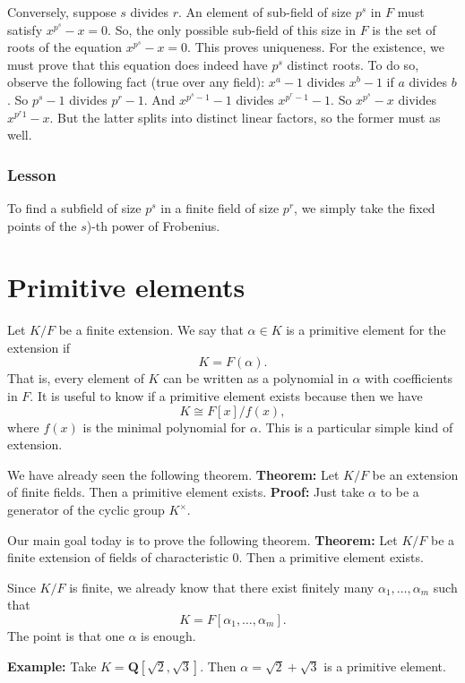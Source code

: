\documentclass[11pt]{article}
\begin{document}
Conversely, suppose \(s\) divides \(r\).
An element of sub-field of size \(p^s\) in \(F\) must satisfy \(x^{p^s}-x = 0\).
So, the only possible sub-field of this size in \(F\) is the set of roots of the equation \(x^{p^s}-x = 0\).
This proves uniqueness.
For the existence, we must prove that this equation does indeed have \(p^s\) distinct roots.
To do so, observe the following fact (true over any field): \(x^a-1\) divides \(x^{b}-1\) if \(a\) divides \(b\).
So \(p^{s}-1\) divides \(p^{r}-1\).
And \(x^{p^s-1}-1\) divides \(x^{p^r-1}-1\).
So \(x^{p^s}-x\) divides \(x^{p^r1}-x\).
But the latter splits into distinct linear factors, so the former must as well.
\subsubsection{Lesson}
\label{sec:orgd071bdc}
To find a subfield of size \(p^{s}\) in a finite field of size \(p^r\), we simply take the fixed points of the \(s\))-th power of Frobenius.
\section{Primitive elements}
\label{sec:org88b84db}
Let \(K/F\) be a finite extension.
We say that \(\alpha \in K\) is a primitive element for the extension if
\[ K = F(\alpha).\]
That is, every element of \(K\) can be written as a polynomial in \(\alpha\) with coefficients in \(F\).
It is useful to know if a primitive element exists because then we have
\[ K \cong F[x]/f(x),\]
where \(f(x)\) is the minimal polynomial for \(\alpha\).
This is a particular simple kind of extension.

We have already seen the following theorem.
\textbf{\textbf{Theorem:}} Let \(K/F\) be an extension of finite fields.  Then a primitive element exists.
\textbf{\textbf{Proof:}} Just take \(\alpha\) to be a generator of the cyclic group \(K^{\times}\).

Our main goal today is to prove the following theorem.
\textbf{\textbf{Theorem:}} Let \(K/F\) be a finite extension of fields of characteristic 0.  Then a primitive element exists.

Since \(K/F\) is finite, we already know that there exist finitely many \(\alpha_1, \dots, \alpha_{m}\) such that
\[ K = F[\alpha_1, \dots, \alpha_m].\]
The point is that one \(\alpha\) is enough.

\textbf{\textbf{Example:}} Take \(K = \mathbf{Q}[\sqrt 2, \sqrt 3]\).  Then \(\alpha = \sqrt 2 + \sqrt 3\) is a primitive element.
\end{document}
